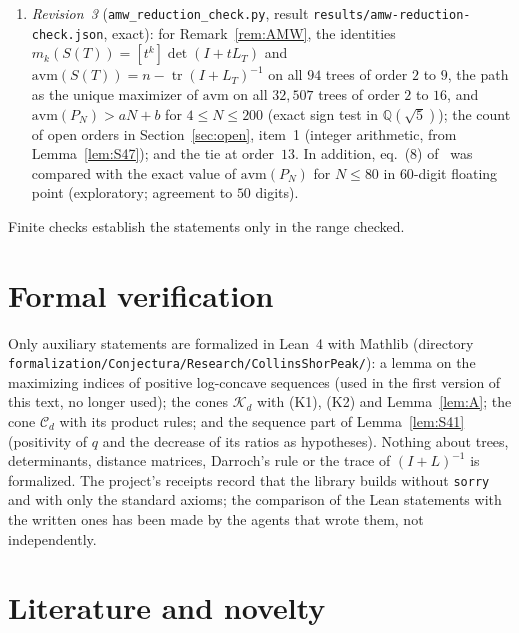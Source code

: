 \documentclass[11pt]{amsart}
\theoremstyle{definition}
\theoremstyle{remark}
\newcommand{\tr}{\operatorname{tr}}
\newcommand{\K}{\mathcal K}
\begin{document}
\begin{enumerate}
Lemma~\ref{lem:S43} on all pairs of rooted trees of order at most $6$;
Lemma~\ref{lem:S42} in floating point (exploratory) on trees of order $3$ to
$14$. The criterion of Lemma~\ref{lem:S47} was checked against the exact peak
of the path for $n\le2000$.
\item \emph{Revision~3} (\nolinkurl{amw_reduction_check.py}, result
\nolinkurl{results/amw-reduction-check.json}, exact): for
Remark~\ref{rem:AMW}, the identities $m_k(S(T))=[t^k]\det(I+tL_T)$ and
$\mathrm{avm}(S(T))=n-\tr(I+L_T)^{-1}$ on all $94$ trees of order $2$ to $9$,
the path as the unique maximizer of $\mathrm{avm}$ on all $32{,}507$ trees of
order $2$ to $16$, and $\mathrm{avm}(P_N)>aN+b$ for $4\le N\le200$ (exact
sign test in $\mathbb Q(\sqrt5)$); the count of open orders in
Section~\ref{sec:open}, item~1 (integer arithmetic, from
Lemma~\ref{lem:S47}); and the tie at order~$13$. In addition, eq.~(8)
of~\cite{AMW} was compared with the exact value of $\mathrm{avm}(P_N)$ for
$N\le80$ in $60$-digit floating point (exploratory; agreement to $50$
digits).
\end{enumerate}
Finite checks establish the statements only in the range checked.

\section{Formal verification}\label{sec:formal}

Only auxiliary statements are formalized in Lean~4 with Mathlib (directory
\nolinkurl{formalization/Conjectura/Research/CollinsShorPeak/}): a lemma on
the maximizing indices of positive log-concave sequences (used in the first
version of this text, no longer used); the cones $\K_d$ with (K1), (K2) and
Lemma~\ref{lem:A}; the cone $\mathcal C_d$ with its product rules; and the
sequence part of Lemma~\ref{lem:S41} (positivity of $q$ and the decrease of
its ratios as hypotheses). Nothing about trees, determinants, distance
matrices, Darroch's rule or the trace of $(I+L)^{-1}$ is formalized. The
project's receipts record that the library builds without \texttt{sorry} and
with only the standard axioms; the comparison of the Lean statements with the
written ones has been made by the agents that wrote them, not independently.

\section{Literature and novelty}\label{sec:literature}
\end{document}
